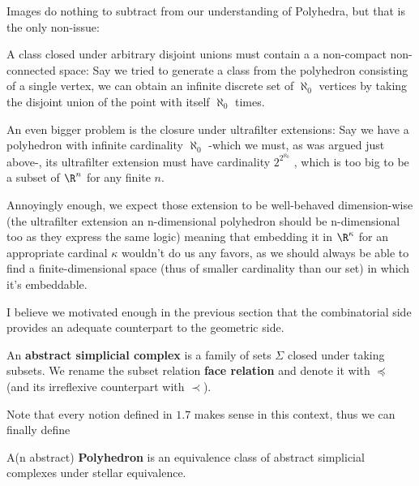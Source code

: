 Images do nothing to subtract from our understanding of Polyhedra, but that is the only non-issue:

A class closed under arbitrary disjoint unions must contain a a non-compact non-connected space: 
Say we tried to generate a class from the polyhedron consisting of a single vertex,
 we can obtain an infinite discrete set of $\aleph_0$ vertices 
 by taking the disjoint union of the point with itself $\aleph_0$ times.

 An even bigger problem is the closure under ultrafilter extensions: 
 Say we have a polyhedron with infinite cardinality $\aleph_0$ -which we must, as was argued just above-,
its ultrafilter extension must have cardinality $2^{2^{\aleph_0}}$ %
, which is too big to be a subset of $\R^n$ for any finite $n$.

Annoyingly enough, we expect those extension to be well-behaved dimension-wise %
(the ultrafilter extension an n-dimensional polyhedron should be n-dimensional too as they express the same logic) %
meaning that embedding it in $\R^\kappa$ for an appropriate cardinal $\kappa$ wouldn't do us any favors, 
as we should always be able to find a finite-dimensional space (thus of smaller cardinality than our set) in which it's embeddable. %

I believe we motivated enough in the previous section that the combinatorial side provides an adequate counterpart to the geometric side.

\begin{definition}\hfill 

An \textbf{abstract simplicial complex} is a family of sets $\Sigma$ closed under taking subsets.
We rename the subset relation \textbf{face relation} and denote it with $\preceq$ (and its irreflexive counterpart with $\prec$).
\end{definition}

Note that every notion defined in $1.7$ makes sense in this context, thus we can finally define 
\begin{definition}\hfill 

    A(n abstract) \textbf{Polyhedron} is an equivalence class of abstract simplicial complexes under stellar equivalence.
\end{definition}

